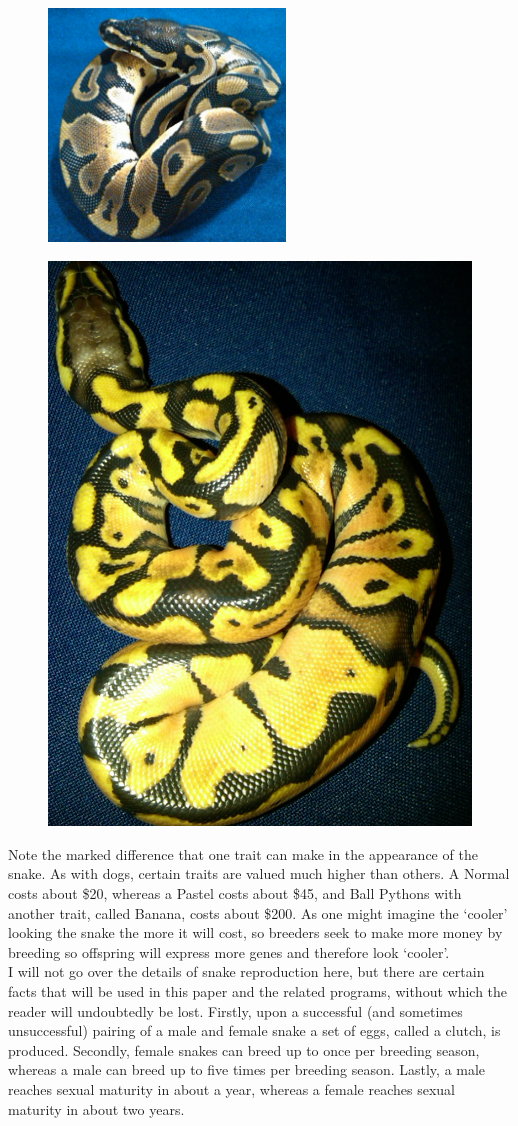 \documentclass{article}
\begin{document}
	\begin{multicols}{2}
	\begin{figure}[H]
	\centering
	\includegraphics[width=.5\textwidth, height = 62mm]{Normal.jpg}
	\end{figure}
	\begin{figure}[H]
	\centering
	\includegraphics[width=.5\textwidth]{Pastel.jpg}
	\end{figure}
	\end{multicols}
	Note the marked difference that one trait can make in the appearance of the snake. As with dogs, certain traits are valued much higher than others. A Normal costs about \$20, whereas a Pastel costs about \$45, and Ball Pythons with another trait, called Banana, costs about \$200. As one might imagine the `cooler' looking the snake the more it will cost, so breeders seek to make more money by breeding so offspring will express more genes and therefore look `cooler'.\\
	\indent I will not go over the details of snake reproduction here, but there are certain facts that will be used in this paper and the related programs, without which the reader will undoubtedly be lost. Firstly, upon a successful (and sometimes unsuccessful) pairing of a male and female snake a set of eggs, called a clutch, is produced. Secondly, female snakes can breed up to once per breeding season, whereas a male can breed up to five times per breeding season. Lastly, a male reaches sexual maturity in about a year, whereas a female reaches sexual maturity in about two years.
\end{document}
